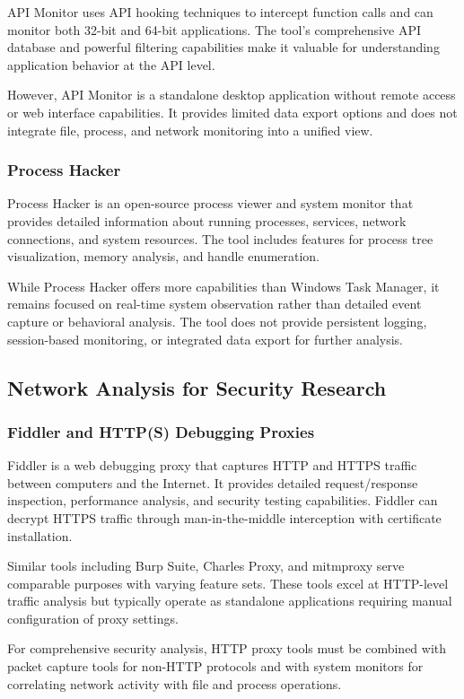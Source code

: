 API Monitor uses API hooking techniques to intercept function calls and can monitor both 32-bit and 64-bit applications. The tool's comprehensive API database and powerful filtering capabilities make it valuable for understanding application behavior at the API level.

However, API Monitor is a standalone desktop application without remote access or web interface capabilities. It provides limited data export options and does not integrate file, process, and network monitoring into a unified view.

\subsubsection{Process Hacker}
Process Hacker is an open-source process viewer and system monitor that provides detailed information about running processes, services, network connections, and system resources. The tool includes features for process tree visualization, memory analysis, and handle enumeration.

While Process Hacker offers more capabilities than Windows Task Manager, it remains focused on real-time system observation rather than detailed event capture or behavioral analysis. The tool does not provide persistent logging, session-based monitoring, or integrated data export for further analysis.

\subsection{Network Analysis for Security Research}

\subsubsection{Fiddler and HTTP(S) Debugging Proxies}
Fiddler is a web debugging proxy that captures HTTP and HTTPS traffic between computers and the Internet. It provides detailed request/response inspection, performance analysis, and security testing capabilities. Fiddler can decrypt HTTPS traffic through man-in-the-middle interception with certificate installation.

Similar tools including Burp Suite, Charles Proxy, and mitmproxy serve comparable purposes with varying feature sets. These tools excel at HTTP-level traffic analysis but typically operate as standalone applications requiring manual configuration of proxy settings.

For comprehensive security analysis, HTTP proxy tools must be combined with packet capture tools for non-HTTP protocols and with system monitors for correlating network activity with file and process operations.

